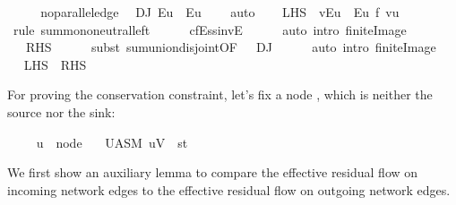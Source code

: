 \begin{isabellebody}
\isamarkupfalse%
\ {\isacharminus}\isanewline
\ \ \isamarkupfalse%
\ no{\isacharunderscore}parallel{\isacharunderscore}edge\ \isamarkupfalse%
\ DJ{\isacharcolon}\ {\isachardoublequoteopen}E{\isacharbackquote}{\isacharbackquote}{\isacharbraceleft}u{\isacharbraceright}\ {\isasyminter}\ E{\isasyminverse}{\isacharbackquote}{\isacharbackquote}{\isacharbraceleft}u{\isacharbraceright}\ {\isacharequal}\ {\isacharbraceleft}{\isacharbraceright}{\isachardoublequoteclose}\ \isamarkupfalse%
\ auto\isanewline
\isanewline
\ \ \isamarkupfalse%
\ {\isachardoublequoteopen}{\isacharquery}LHS\ {\isacharequal}\ {\isacharparenleft}{\isasymSum}v{\isasymin}E{\isacharbackquote}{\isacharbackquote}{\isacharbraceleft}u{\isacharbraceright}\ {\isasymunion}\ E{\isasyminverse}{\isacharbackquote}{\isacharbackquote}{\isacharbraceleft}u{\isacharbraceright}{\isachardot}\ f{\isacharprime}\ {\isacharparenleft}v{\isacharcomma}u{\isacharparenright}{\isacharparenright}{\isachardoublequoteclose}\isanewline
\ \ \ \ \isamarkupfalse%
\ {\isacharparenleft}rule\ sum{\isachardot}mono{\isacharunderscore}neutral{\isacharunderscore}left{\isacharparenright}\isanewline
\ \ \ \ \isamarkupfalse%
\ cfE{\isacharunderscore}ss{\isacharunderscore}invE\isanewline
\ \ \ \ \isamarkupfalse%
\ {\isacharparenleft}auto\ intro{\isacharcolon}\ finite{\isacharunderscore}Image{\isacharparenright}\isanewline
\ \ \isamarkupfalse%
\ \isamarkupfalse%
\ {\isachardoublequoteopen}{\isasymdots}\ {\isacharequal}\ {\isacharquery}RHS{\isachardoublequoteclose}\isanewline
\ \ \ \ \isamarkupfalse%
\ {\isacharparenleft}subst\ sum{\isachardot}union{\isacharunderscore}disjoint{\isacharbrackleft}OF\ {\isacharunderscore}\ {\isacharunderscore}\ DJ{\isacharbrackright}{\isacharparenright}\isanewline
\ \ \ \ \isamarkupfalse%
\ {\isacharparenleft}auto\ intro{\isacharcolon}\ finite{\isacharunderscore}Image{\isacharparenright}\isanewline
\ \ \isamarkupfalse%
\ \isamarkupfalse%
\ {\isachardoublequoteopen}{\isacharquery}LHS\ {\isacharequal}\ {\isacharquery}RHS{\isachardoublequoteclose}\ \isacommand{{\isachardot}}\isamarkupfalse%
\isanewline
{}\isamarkupfalse%
%
\endisatagproof
{\isafoldproof}%
%
\isadelimproof
%
\endisadelimproof
%
\begin{isamarkuptext}%
For proving the conservation constraint, let's fix a node , which
  is neither the source nor the sink:%
\end{isamarkuptext}\isamarkuptrue%
\isamarkupfalse%
\ \isanewline
\ \ \ u\ {\isacharcolon}{\isacharcolon}\ node\isanewline
\ \ \ U{\isacharunderscore}ASM{\isacharcolon}\ {\isachardoublequoteopen}u{\isasymin}V\ {\isacharminus}\ {\isacharbraceleft}s{\isacharcomma}t{\isacharbraceright}{\isachardoublequoteclose}\isanewline
{}%
\begin{isamarkuptext}%
We first show an auxiliary lemma to compare the 
  effective residual flow on incoming network edges to
  the effective residual flow on outgoing network edges.
  

\end{isamarkuptext}
\end{isabellebody}
